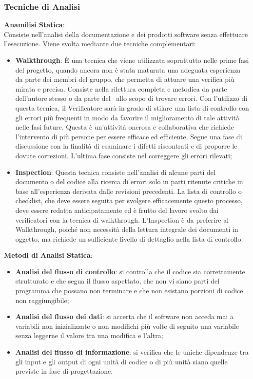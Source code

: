 \subsubsection{Tecniche di Analisi}
\textbf{Anamilisi Statica}:\medskip \\ 
Consiste nell'analisi della documentazione e dei prodotti software senza effettuare l'esecuzione. Viene svolta mediante due tecniche complementari:
\begin{itemize}
	\item \textbf{Walkthrough}:
	È una tecnica che viene utilizzata soprattutto nelle prime fasi del progetto, quando ancora non è stata maturata una adeguata esperienza da parte dei membri del gruppo, che permetta di attuare una verifica più mirata e precisa. Consiste nella rilettura completa e metodica da
	parte dell'autore stesso o da parte del \ruoloVerificatore\ allo scopo di trovare errori. Con l'utilizzo di questa tecnica, il Verificatore sarà in grado di stilare una lista di controllo con gli errori più frequenti in modo da favorire il miglioramento di tale attività nelle fasi future. Questa è un'attività onerosa e collaborativa che richiede l'intervento di più persone per essere efficace ed efficiente. Segue una fase di discussione con la finalità di esaminare i difetti riscontrati e di proporre le dovute correzioni. L'ultima fase consiste nel correggere gli errori rilevati;
	\item \textbf{Inspection}:
	Questa tecnica consiste nell'analisi di alcune parti del documento o del codice alla ricerca di errori solo in parti ritenute critiche in base all'esperienza derivata dalle revisioni precedenti. La lista di controllo o checklist, che deve essere seguita per svolgere efficacemente questo processo, deve essere redatta anticipatamente ed è frutto del lavoro svolto dai verificatori con la tecnica di walkthrough. L'Inspection è da preferire al Walkthrough, poiché  non necessità della lettura integrale dei documenti in oggetto, ma richiede un sufficiente livello di dettaglio nella lista di controllo.	    
\end{itemize}
\textbf{Metodi di Analisi Statica}:
\begin{itemize}
	\item \textbf{Analisi del flusso di controllo}: si controlla che il codice sia correttamente strutturato e che segua il flusso aspettato, che non vi siano parti del programma che possano non terminare e che non esistano porzioni di codice non raggiungibile;
	\item \textbf{Analisi del flusso dei dati}: si accerta che il software non acceda mai a variabili non inizializzate o non modifichi più volte di seguito una variabile senza leggerne il valore tra una modifica e l'altra;
	\item \textbf{Analisi del flusso di informazione}: si verifica che le uniche dipendenze tra gli input e gli output di ogni unità di codice o di più unità siano quelle previste in fase di progettazione.
\end{itemize}
